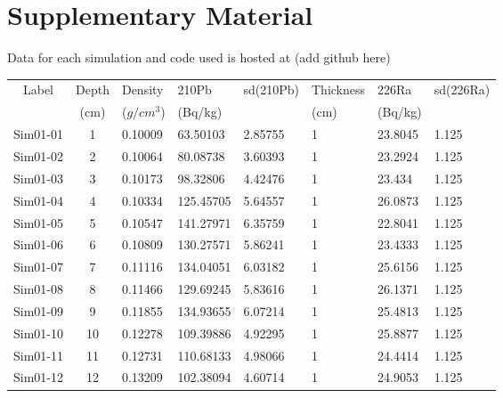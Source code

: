 \documentclass [10pt] {article}
\begin{document}
\section{Supplementary Material}
\label{sec:supp_mat}
Data for each simulation and code used is hosted at (add github here)
\newpage
\begin{table}[H]
	\begin{tabular}{c|cllllll}
		Label    & Depth & Density  & 210Pb & sd(210Pb) & Thickness& 226Ra  & sd(226Ra) \\
		& (cm) &($g/cm^3$) &(Bq/kg)& & (cm) & (Bq/kg)&\\
		\hline 
		Sim01-01 & 1          & 0.10009                         & 63.50103      & 2.85755   & 1              & 23.8045       & 1.125     \\
		Sim01-02 & 2          & 0.10064                         & 80.08738      & 3.60393   & 1              & 23.2924       & 1.125     \\
		Sim01-03 & 3          & 0.10173                         & 98.32806      & 4.42476   & 1              & 23.434        & 1.125     \\
		Sim01-04 & 4          & 0.10334                         & 125.45705     & 5.64557   & 1              & 26.0873       & 1.125     \\
		Sim01-05 & 5          & 0.10547                         & 141.27971     & 6.35759   & 1              & 22.8041       & 1.125     \\
		Sim01-06 & 6          & 0.10809                         & 130.27571     & 5.86241   & 1              & 23.4333       & 1.125     \\
		Sim01-07 & 7          & 0.11116                         & 134.04051     & 6.03182   & 1              & 25.6156       & 1.125     \\
		Sim01-08 & 8          & 0.11466                         & 129.69245     & 5.83616   & 1              & 26.1371       & 1.125     \\
		Sim01-09 & 9          & 0.11855                         & 134.93655     & 6.07214   & 1              & 25.4813       & 1.125     \\
		Sim01-10 & 10         & 0.12278                         & 109.39886     & 4.92295   & 1              & 25.8877       & 1.125     \\
		Sim01-11 & 11         & 0.12731                         & 110.68133     & 4.98066   & 1              & 24.4414       & 1.125     \\
		Sim01-12 & 12         & 0.13209                         & 102.38094     & 4.60714   & 1              & 24.9053       & 1.125     \\

\end{tabular}
\end{table}
\end{document}
